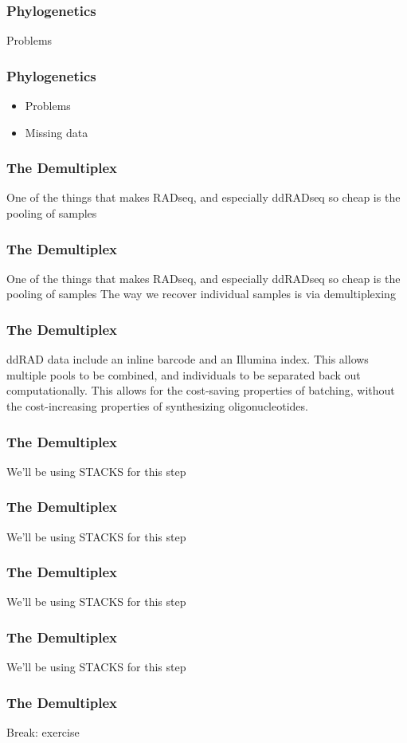 \documentclass{beamer}
\begin{document}
\begin{frame}
\frametitle{Phylogenetics}
\item Problems
\end{frame}

\begin{frame}
\frametitle{Phylogenetics}
\begin{itemize}
\item Problems
\item Missing data
\end{itemize}
\end{frame}

\begin{frame}
\frametitle{The Demultiplex}
One of the things that makes RADseq, and especially ddRADseq so cheap is the pooling of samples
\end{frame}

\begin{frame}
\frametitle{The Demultiplex}
One of the things that makes RADseq, and especially ddRADseq so cheap is the pooling of samples
The way we recover individual samples is via demultiplexing
\end{frame}

\begin{frame}
\frametitle{The Demultiplex}
ddRAD data include an inline barcode and an Illumina index. This allows multiple pools to be combined, and individuals to be separated back out computationally. 
This allows for the cost-saving properties of batching, without the cost-increasing properties of synthesizing oligonucleotides.
\end{frame}

\begin{frame}
\frametitle{The Demultiplex}
We'll be using STACKS for this step
\end{frame}

\begin{frame}
\frametitle{The Demultiplex}
We'll be using STACKS for this step
\end{frame}

\begin{frame}
\frametitle{The Demultiplex}
We'll be using STACKS for this step
\end{frame}

\begin{frame}
\frametitle{The Demultiplex}
We'll be using STACKS for this step
\end{frame}

\begin{frame}
\frametitle{The Demultiplex}
Break: exercise
\end{frame}
\end{document}
